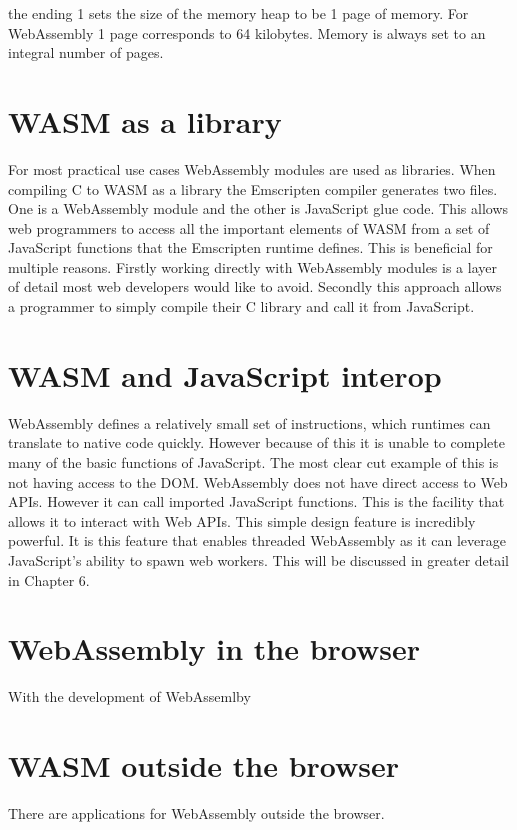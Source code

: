 \documentclass[11pt]{book}
\begin{document}
the ending 1 sets the size of the memory heap to be 1 page of memory. For WebAssembly 1 page corresponds to 64 kilobytes. Memory is always set to an integral number of pages.
\section{WASM as a library}

For most practical use cases WebAssembly modules are used as libraries. When compiling C to WASM as a library the Emscripten compiler generates two files. One is a WebAssembly module and the other is JavaScript glue code. This allows web programmers to access all the important elements of WASM from a set of JavaScript functions that the Emscripten runtime defines. This is beneficial for multiple reasons. Firstly working directly with WebAssembly modules is a layer of detail most web developers would like to avoid. Secondly this approach allows a programmer to simply compile their C library and call it from JavaScript. 

\section{WASM and JavaScript interop}

WebAssembly defines a relatively small set of instructions, which runtimes can translate to native code quickly. However because of this it is unable to complete many of the basic functions of JavaScript. The most clear cut example of this is not having access to the DOM. 
WebAssembly does not have direct access to Web APIs. However it can call imported JavaScript functions. This is the facility that allows it to interact with Web APIs. This simple design feature is incredibly powerful. It is this feature that enables threaded WebAssembly as it can leverage JavaScript's ability to spawn web workers. This will be discussed in greater detail in Chapter 6.

\section{WebAssembly in the browser}

With the development of WebAssemlby


\section{WASM outside the browser}

There are applications for WebAssembly outside the browser. 
\end{document}
